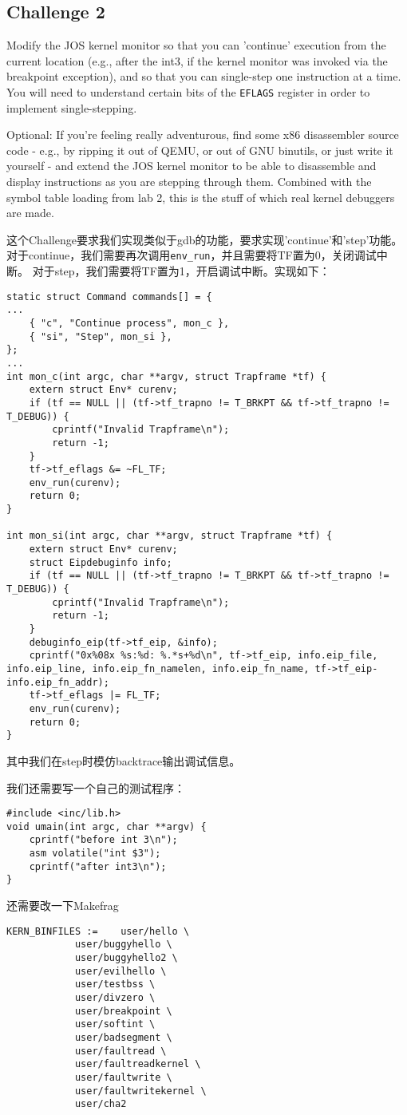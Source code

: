 \documentclass[11pt]{article}
\begin{document}
\subsection{Challenge 2}
\begin{framed}
Modify the JOS kernel monitor so that you can 'continue' execution from the current location (e.g., after the int3, if the kernel monitor was invoked via the breakpoint exception), and so that you can single-step one instruction at a time. You will need to understand certain bits of the \lstinline|EFLAGS| register in order to implement single-stepping.

Optional: If you're feeling really adventurous, find some x86 disassembler source code - e.g., by ripping it out of QEMU, or out of GNU binutils, or just write it yourself - and extend the JOS kernel monitor to be able to disassemble and display instructions as you are stepping through them. Combined with the symbol table loading from lab 2, this is the stuff of which real kernel debuggers are made. 
\end{framed}
这个Challenge要求我们实现类似于gdb的功能，要求实现'continue'和'step'功能。
对于continue，我们需要再次调用\lstinline|env_run|，并且需要将TF置为0，关闭调试中断。
对于step，我们需要将TF置为1，开启调试中断。实现如下：
\begin{lstlisting}[title=kern/monitor.c]
static struct Command commands[] = {
...
	{ "c", "Continue process", mon_c },
	{ "si", "Step", mon_si },
};
...
int mon_c(int argc, char **argv, struct Trapframe *tf) {
	extern struct Env* curenv;
	if (tf == NULL || (tf->tf_trapno != T_BRKPT && tf->tf_trapno != T_DEBUG)) {
		cprintf("Invalid Trapframe\n");
		return -1;
	}
	tf->tf_eflags &= ~FL_TF;
	env_run(curenv);
	return 0;
}

int mon_si(int argc, char **argv, struct Trapframe *tf) {
	extern struct Env* curenv;
	struct Eipdebuginfo info;
	if (tf == NULL || (tf->tf_trapno != T_BRKPT && tf->tf_trapno != T_DEBUG)) {
		cprintf("Invalid Trapframe\n");
		return -1;
	}
	debuginfo_eip(tf->tf_eip, &info);
	cprintf("0x%08x %s:%d: %.*s+%d\n", tf->tf_eip, info.eip_file, info.eip_line, info.eip_fn_namelen, info.eip_fn_name, tf->tf_eip-info.eip_fn_addr);
	tf->tf_eflags |= FL_TF;
	env_run(curenv);
	return 0;
}
\end{lstlisting}
其中我们在step时模仿backtrace输出调试信息。

我们还需要写一个自己的测试程序：
\begin{lstlisting}[title=user/cha2.c]
#include <inc/lib.h>
void umain(int argc, char **argv) {
	cprintf("before int 3\n");
	asm volatile("int $3");
	cprintf("after int3\n");
}
\end{lstlisting}
还需要改一下Makefrag
\begin{lstlisting}[title=kern/Makefrag]
KERN_BINFILES :=	user/hello \
			user/buggyhello \
			user/buggyhello2 \
			user/evilhello \
			user/testbss \
			user/divzero \
			user/breakpoint \
			user/softint \
			user/badsegment \
			user/faultread \
			user/faultreadkernel \
			user/faultwrite \
			user/faultwritekernel \
			user/cha2
\end{lstlisting}
\end{document}
